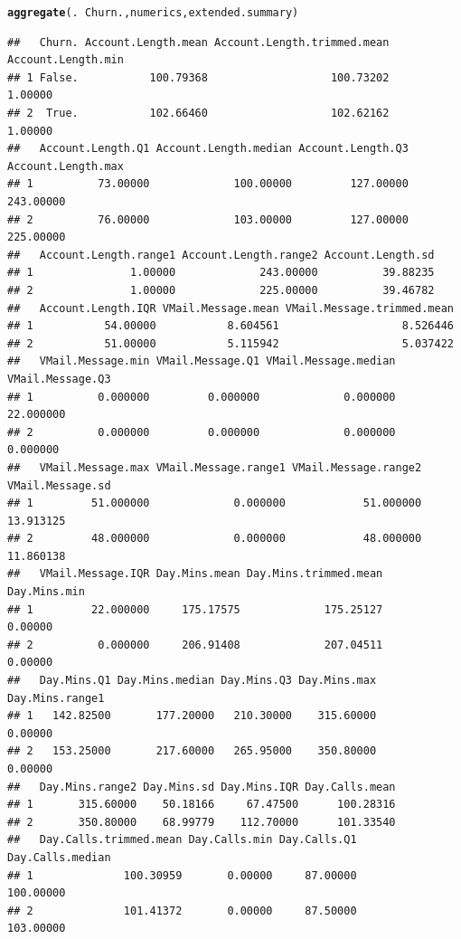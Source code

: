 \documentclass{article}\usepackage[]{graphicx}\usepackage[]{color}
\makeatletter
\newcommand{\hlopt}[1]{\textcolor[rgb]{0,0,0}{#1}}%
\newcommand{\hlstd}[1]{\textcolor[rgb]{0.345,0.345,0.345}{#1}}%
\newcommand{\hlkwd}[1]{\textcolor[rgb]{0.737,0.353,0.396}{\textbf{#1}}}%
\newenvironment{kframe}{%
 \def\at@end@of@kframe{}%
 \ifinner\ifhmode%
  \def\at@end@of@kframe{\end{minipage}}%
  \begin{minipage}{\columnwidth}%
 \fi\fi%
 \def\FrameCommand##1{\hskip\@totalleftmargin \hskip-\fboxsep
 \colorbox{shadecolor}{##1}\hskip-\fboxsep
     \hskip-\linewidth \hskip-\@totalleftmargin \hskip\columnwidth}%
 \MakeFramed {\advance\hsize-\width
   \@totalleftmargin\z@ \linewidth\hsize
   \@setminipage}}%
 {\par\unskip\endMakeFramed%
 \at@end@of@kframe}
\newenvironment{knitrout}{}{} %
\makeatother
\begin{document}
\begin{description}
\begin{knitrout}
\color{fgcolor}\begin{kframe}
\begin{alltt}
\hlkwd{aggregate}\hlstd{(.} \hlopt{~} \hlstd{Churn., numerics, extended.summary)}
\end{alltt}
\begin{verbatim}
##   Churn. Account.Length.mean Account.Length.trimmed.mean Account.Length.min
## 1 False.           100.79368                   100.73202            1.00000
## 2  True.           102.66460                   102.62162            1.00000
##   Account.Length.Q1 Account.Length.median Account.Length.Q3 Account.Length.max
## 1          73.00000             100.00000         127.00000          243.00000
## 2          76.00000             103.00000         127.00000          225.00000
##   Account.Length.range1 Account.Length.range2 Account.Length.sd
## 1               1.00000             243.00000          39.88235
## 2               1.00000             225.00000          39.46782
##   Account.Length.IQR VMail.Message.mean VMail.Message.trimmed.mean
## 1           54.00000           8.604561                   8.526446
## 2           51.00000           5.115942                   5.037422
##   VMail.Message.min VMail.Message.Q1 VMail.Message.median VMail.Message.Q3
## 1          0.000000         0.000000             0.000000        22.000000
## 2          0.000000         0.000000             0.000000         0.000000
##   VMail.Message.max VMail.Message.range1 VMail.Message.range2 VMail.Message.sd
## 1         51.000000             0.000000            51.000000        13.913125
## 2         48.000000             0.000000            48.000000        11.860138
##   VMail.Message.IQR Day.Mins.mean Day.Mins.trimmed.mean Day.Mins.min
## 1         22.000000     175.17575             175.25127      0.00000
## 2          0.000000     206.91408             207.04511      0.00000
##   Day.Mins.Q1 Day.Mins.median Day.Mins.Q3 Day.Mins.max Day.Mins.range1
## 1   142.82500       177.20000   210.30000    315.60000         0.00000
## 2   153.25000       217.60000   265.95000    350.80000         0.00000
##   Day.Mins.range2 Day.Mins.sd Day.Mins.IQR Day.Calls.mean
## 1       315.60000    50.18166     67.47500      100.28316
## 2       350.80000    68.99779    112.70000      101.33540
##   Day.Calls.trimmed.mean Day.Calls.min Day.Calls.Q1 Day.Calls.median
## 1              100.30959       0.00000     87.00000        100.00000
## 2              101.41372       0.00000     87.50000        103.00000

\end{verbatim}
\end{kframe}
\end{knitrout}
\end{description}
\end{document}
